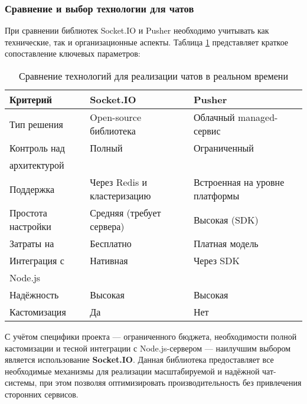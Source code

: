 \subsubsection*{Сравнение и выбор технологии для чатов}

При сравнении библиотек Socket.IO и Pusher необходимо учитывать как технические, так и организационные аспекты. Таблица \ref{tab:chat-comparison} представляет краткое сопоставление ключевых параметров:

\begin{table}[h]
  \centering
  \caption{Сравнение технологий для реализации чатов в реальном времени}
  \small
  \label{tab:chat-comparison}
  \begin{tabular}{|l|p{5cm}|p{5cm}|}
    \hline
    \textbf{Критерий} & \textbf{Socket.IO}               & \textbf{Pusher}                 \\ \hline
    Тип решения      & Open-source библиотека           & Облачный managed-сервис         \\ \hline
    Контроль над     & Полный                           & Ограниченный                    \\ 
    архитектурой     &                                  &                                 \\ \hline
    Поддержка        & Через Redis и кластеризацию      & Встроенная на уровне платформы  \\ \hline
    Простота настройки & Средняя (требует сервера)      & Высокая (SDK)                   \\ \hline
    Затраты на       & Бесплатно                        & Платная модель                  \\ \hline
    Интеграция с     & Нативная                         & Через SDK                       \\ 
    Node.js          &                                  &                                 \\ \hline
    Надёжность       & Высокая                          & Высокая                         \\ \hline
    Кастомизация     & Да                               & Нет                             \\ \hline
  \end{tabular}
\end{table}

С учётом специфики проекта — ограниченного бюджета, необходимости полной кастомизации и тесной интеграции с Node.js-сервером — наилучшим выбором является использование \textbf{Socket.IO}. Данная библиотека предоставляет все необходимые механизмы для реализации масштабируемой и надёжной чат-системы, при этом позволяя оптимизировать производительность без привлечения сторонних сервисов.

